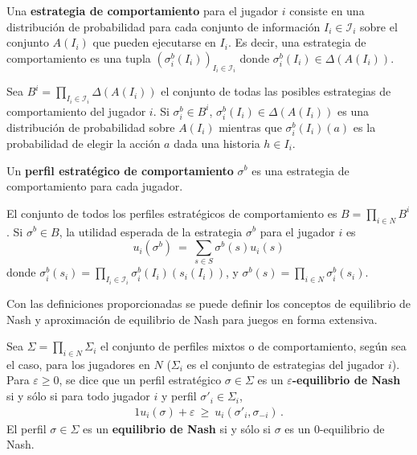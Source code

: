 \begin{definition}
\label{def:estrategia-comportamiento}
Una \textbf{estrategia de comportamiento} para el jugador $i$ consiste en una distribución de probabilidad para cada conjunto de información $I_i \in \mathcal{I}_i$ sobre el conjunto $A(I_i)$ que pueden ejecutarse en $I_i$.
Es decir, una estrategia de comportamiento es una tupla $(\sigma^b_i(I_i))_{I_i \in \mathcal{I}_i}$ donde $\sigma^b_i(I_i) \in \Delta(A(I_i))$.
\end{definition}

Sea $B^i = \prod_{I_i \in \mathcal{I}_i} \Delta(A(I_i))$ el conjunto de todas las posibles estrategias de comportamiento del jugador $i$. Si $\sigma_i^b \in B^i$, $\sigma_i^b(I_i) \in \Delta(A(I_i))$ es una distribución de probabilidad sobre $A(I_i)$ mientras que $\sigma_i^b(I_i)(a)$ es la probabilidad de elegir la acción $a$ dada una historia $h \in I_i$.

\begin{definition}
Un \textbf{perfil estratégico de comportamiento} $\sigma^b$ es una estrategia de comportamiento para cada jugador.
\end{definition}

El conjunto de todos los perfiles estratégicos de comportamiento es $B = \prod_{i \in N} B^i$. Si $\sigma^b \in B$, la utilidad esperada de la estrategia $\sigma^b$ para el jugador $i$ es
\[ u_i(\sigma^b)\ =\ \sum_{s \in S} \sigma^b(s)u_i(s) \]
donde $\sigma_i^b(s_i) = \prod_{I_i \in \mathcal{I}_i} \sigma_i^b(I_i)(s_i(I_i))$, y $\sigma^b(s) =  \prod_{i \in N} \sigma_i^b(s_i)$.

Con las definiciones proporcionadas se puede definir los conceptos de equilibrio de Nash y aproximación de equilibrio de Nash para juegos en forma extensiva.

\begin{definition}
Sea $\Sigma=\prod_{i\in N}\Sigma_i$ el conjunto de perfiles mixtos o de comportamiento, según sea el caso, para los jugadores en $N$ ($\Sigma_i$ es el conjunto de estrategias del jugador $i$).
Para $\varepsilon\geq 0$, se dice que un perfil estratégico $\sigma \in \Sigma$ es un \textbf{$\varepsilon$-equilibrio de Nash} si y sólo si para todo jugador $i$ y perfil $\sigma'_i\in\Sigma_i$,
\begin{alignat}{1}
u_i(\sigma) + \varepsilon\ \geq\ u_i(\sigma'_i, \sigma_{-i}) \,.
\end{alignat}
El perfil $\sigma\in\Sigma$ es un \textbf{equilibrio de Nash} si y sólo si $\sigma$ es un $0$-equilibrio de Nash.
\end{definition}


